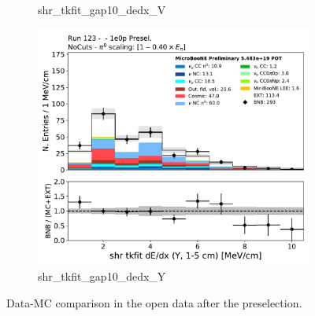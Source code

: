\begin{figure}[H]
\begin{center}
\begin{subfigure}[b]{0.3\textwidth}
    \caption{\label{fig:1e0p:dataMCRun1:shr_tkfit_gap10_dedx_V} shr\_tkfit\_gap10\_dedx\_V }
    \end{subfigure}
    \begin{subfigure}[b]{0.3\textwidth}
    \centering
    \includegraphics[width=1.00\textwidth]{1e0p/dataMCRun123/shr_tkfit_gap10_dedx_Y.pdf}
    \caption{\label{fig:1e0p:dataMCRun1:shr_tkfit_gap_dedx_Y} shr\_tkfit\_gap10\_dedx\_Y }
    \end{subfigure}
\caption{\label{fig:1e0p:dataMCRun1:shr_tkfit_dedx_2cm}Data-MC comparison in the open data after the \zpsel preselection.}
\end{center}
\end{figure}

